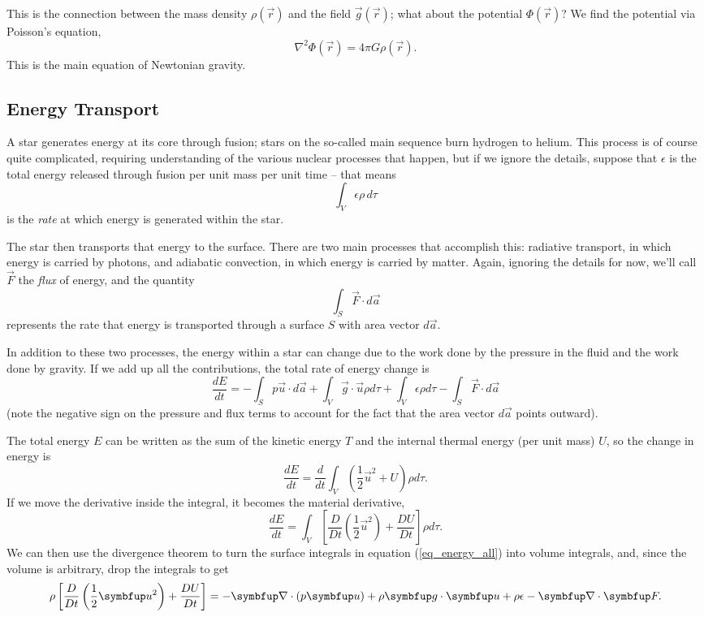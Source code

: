 This is the connection between the mass density $\rho(\vec{r})$ and the field $\vec{g}(\vec{r})$; what about the potential $\Phi(\vec{r})$?  We find the potential via Poisson's equation,
\begin{equation}
\label{eq_poisson}
\boxed{
\nabla^2 \Phi(\vec{r}) = 4 \pi G \rho(\vec{r}).
}
\end{equation}
This is the main equation of Newtonian gravity.


\subsection{Energy Transport}

A star generates energy at its core through fusion; stars on the so-called main sequence burn hydrogen to helium.  This process is of course quite complicated, requiring understanding of the various nuclear processes that happen, but if we ignore the details, suppose that $\epsilon$ is the total energy released through fusion per unit mass per unit time -- that means
\[
\int_V \epsilon \rho \, d\tau
\]
is the \emph{rate} at which energy is generated within the star.

The star then transports that energy to the surface.  There are two main processes that accomplish this:  radiative transport, in which energy is carried by photons, and adiabatic convection, in which energy is carried by matter.  Again, ignoring the details for now, we'll call $\vec{F}$ the \emph{flux} of energy, and the quantity
\[
\int_S \vec{F} \cdot d\vec{a}
\]
represents the rate that energy is transported through a surface $S$ with area vector $d\vec{a}$.

In addition to these two processes, the energy within a star can change due to the work done by the pressure in the fluid and the work done by gravity.  If we add up all the contributions, the total rate of energy change is
\begin{equation}
\label{eq_energy_all}
\frac{dE}{dt} = - \int_S p \vec{u} \cdot d\vec{a} + \int_V \vec{g} \cdot \vec{u} \rho d\tau + \int_V \epsilon \rho d\tau - \int_S \vec{F} \cdot d\vec{a}
\end{equation}
(note the negative sign on the pressure and flux terms to account for the fact that the area vector $d\vec{a}$ points outward).

The total energy $E$ can be written as the sum of the kinetic energy $T$ and the internal thermal energy (per unit mass) $U$, so the change in energy is
\[
\frac{dE}{dt} = \frac{d}{dt}\int_V \left( \frac{1}{2} \vec{u}^2 + U \right) \rho d\tau.
\]
If we move the derivative inside the integral, it becomes the material derivative, 
\[
\frac{dE}{dt} = \int_V \left[ \frac{D}{Dt}\left( \frac{1}{2} \vec{u}^2 \right) + \frac{DU}{Dt} \right] \rho d\tau.
\]
We can then use the divergence theorem to turn the surface integrals in equation (\ref{eq_energy_all}) into volume integrals, and, since the volume is arbitrary, drop the integrals to get
\begin{equation}
\label{eq_energy_all2}
\rho \left[ \frac{D}{Dt}\left( \frac{1}{2} \vec{u}^2 \right) + \frac{DU}{Dt} \right] = -\grad \cdot (p\vec{u}) + \rho \vec{g} \cdot \vec{u} + \rho \epsilon - \grad \cdot \vec{F}.
\end{equation}

